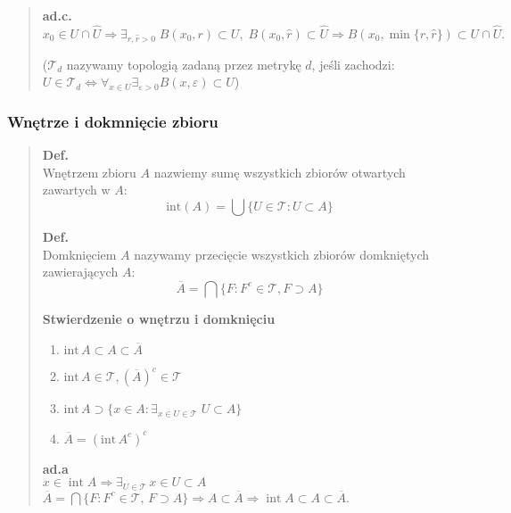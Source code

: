 \documentclass[10pt,a4paper]{article}
\begin{document}
{\begin{quote}
\begin{tcolorbox}[mybox]
    \textbf{ad.c.}\\
    \( x_0 \in U \cap \widehat{U} \Rightarrow \exists_{r, \widehat{r} > 0}\; B(x_0, r) \subset U,\; B(x_0, \widehat{r}) \subset \widehat{U} \Rightarrow B(x_0, \min\{r, \widehat{r}\}) \subset U \cap \widehat{U}.
    \)\\
    \end{tcolorbox}

    ($\mathcal{T}_d$ nazywamy topologią zadaną przez metrykę $d$, jeśli zachodzi: $U \in \mathcal{T}_d \iff \forall_{x \in U} \exists_{\varepsilon > 0} B(x, \varepsilon) \subset U$)
    \end{quote}

    \subsubsection*{Wnętrze i dokmnięcie zbioru}
    \begin{quote}
    \textbf{Def.}\\ Wnętrzem zbioru $A$ nazwiemy sumę wszystkich zbiorów otwartych zawartych w $A$:
    $$\mathrm{int}(A) = \bigcup \{U \in \mathcal{T} : U \subset A\}$$

    \textbf{Def.}\\ Domknięciem $A$ nazywamy przecięcie wszystkich zbiorów domkniętych zawierających $A$:
    $$\overline{A} = \bigcap \{F : F^c \in \mathcal{T}, F \supset A\}$$

    \textbf{Stwierdzenie o wnętrzu i domknięciu}
    \begin{enumerate}[label=\alph*)]
    \item $\mathrm{int}\, A \subset A \subset \overline{A}$
    \item $\mathrm{int}\, A \in \mathcal{T}, (\overline{A})^c \in \mathcal{T}$
    \item $\mathrm{int}\, A \supset \{x \in A: \exists_{x \in U \in \mathcal{T}} \; U \subset A\}$
    \item $\overline{A} = (\mathrm{int}\, A^c)^c$
    \end{enumerate}

    \begin{tcolorbox}[mybox]
    \textbf{ad.\;a}\\
    \( x \in \operatorname{int}A \Rightarrow \exists_{U \in \mathcal{T}}\, x \in U \subset A \)\\
    \( \overline{A} = \bigcap \{ F : F^c \in \mathcal{T},\, F \supset A \} \Rightarrow A \subset \overline{A} \Rightarrow \operatorname{int}A \subset A \subset \overline{A}. \)\\[6pt]


\end{tcolorbox}
\end{quote}}
\end{document}
